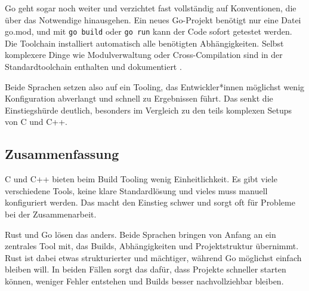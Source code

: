 Go geht sogar noch weiter und verzichtet fast vollständig auf Konventionen, die über das Notwendige hinausgehen. 
Ein neues Go-Projekt benötigt nur eine Datei go.mod, und mit \texttt{go build} oder \texttt{go run} kann der Code sofort getestet werden. 
Die Toolchain installiert automatisch alle benötigten Abhängigkeiten. Selbst komplexere Dinge wie Modulverwaltung 
oder Cross-Compilation sind in der Standardtoolchain enthalten und dokumentiert \autocite{UsingGoModules,UnderstandingGoModulesBeginners}.

Beide Sprachen setzen also auf ein Tooling, das Entwickler*innen möglichst wenig Konfiguration abverlangt und schnell zu Ergebnissen führt. 
Das senkt die Einstiegshürde deutlich, besonders im Vergleich zu den teils komplexen Setups von C und C++.

\subsection{Zusammenfassung}
\label{subsec:Build_Tooling_Zusammenfassung}

C und C++ bieten beim Build Tooling wenig Einheitlichkeit. Es gibt viele verschiedene Tools, keine klare Standardlösung 
und vieles muss manuell konfiguriert werden. Das macht den Einstieg schwer und sorgt oft für Probleme bei der Zusammenarbeit.

Rust und Go lösen das anders. Beide Sprachen bringen von Anfang an ein zentrales Tool mit, das Builds, 
Abhängigkeiten und Projektstruktur übernimmt. Rust ist dabei etwas strukturierter und mächtiger, 
während Go möglichst einfach bleiben will. In beiden Fällen sorgt das dafür, dass Projekte schneller starten können, 
weniger Fehler entstehen und Builds besser nachvollziehbar bleiben.
